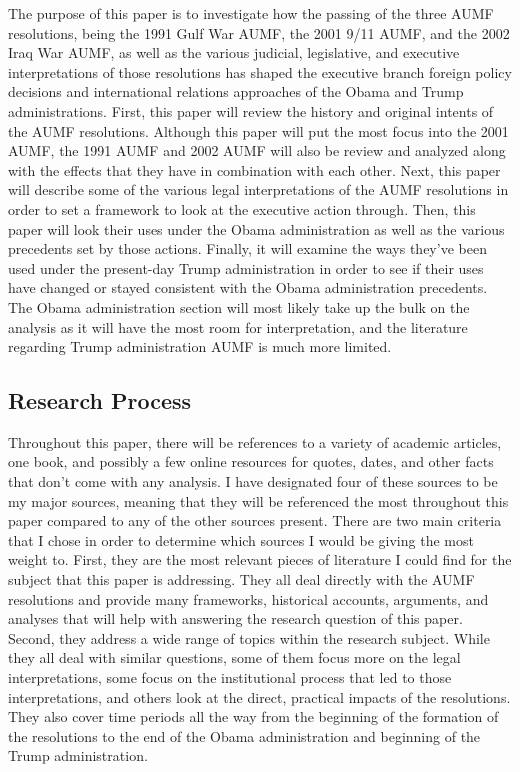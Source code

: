\documentclass[12pt]{article}
\begin{document}
The purpose of this paper is to investigate how the passing of the three AUMF resolutions, being the 1991 Gulf War AUMF, the 2001 9/11 AUMF, and the 2002 Iraq War AUMF, as well as the various judicial, legislative, and executive interpretations of those resolutions has shaped the executive branch foreign policy decisions and international relations approaches of the Obama and Trump administrations.
First, this paper will review the history and original intents of the AUMF resolutions.
Although this paper will put the most focus into the 2001 AUMF, the 1991 AUMF and 2002 AUMF will also be review and analyzed along with the effects that they have in combination with each other.
Next, this paper will describe some of the various legal interpretations of the AUMF resolutions in order to set a framework to look at the executive action through.
Then, this paper will look their uses under the Obama administration as well as the various precedents set by those actions.
Finally, it will examine the ways they've been used under the present-day Trump administration in order to see if their uses have changed or stayed consistent with the Obama administration precedents.
The Obama administration section will most likely take up the bulk on the analysis as it will have the most room for interpretation, and the literature regarding Trump administration AUMF is much more limited.

\subsection*{Research Process}
Throughout this paper, there will be references to a variety of academic articles, one book, and possibly a few online resources for quotes, dates, and other facts that don't come with any analysis.
I have designated four of these sources to be my major sources, meaning that they will be referenced the most throughout this paper compared to any of the other sources present.
There are two main criteria that I chose in order to determine which sources I would be giving the most weight to.
First, they are the most relevant pieces of literature I could find for the subject that this paper is addressing.
They all deal directly with the AUMF resolutions and provide many frameworks, historical accounts, arguments, and analyses that will help with answering the research question of this paper.
Second, they address a wide range of topics within the research subject.
While they all deal with similar questions, some of them focus more on the legal interpretations, some focus on the institutional process that led to those interpretations, and others look at the direct, practical impacts of the resolutions.
They also cover time periods all the way from the beginning of the formation of the resolutions to the end of the Obama administration and beginning of the Trump administration.
\end{document}
